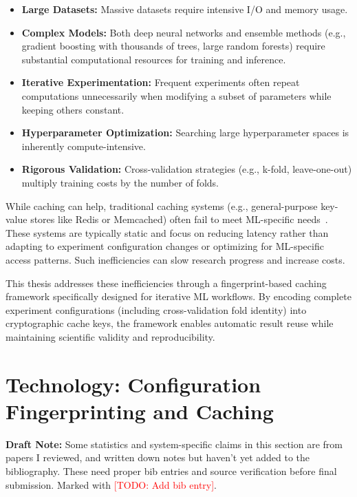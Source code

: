 \documentclass{imc-inf} %
\begin{document}
\begin{itemize}
\item \textbf{Large Datasets:} Massive datasets require intensive I/O and 
      memory usage.
      
\item \textbf{Complex Models:} Both deep neural networks and ensemble 
      methods (e.g., gradient boosting with thousands of trees, large 
      random forests) require substantial computational resources for 
      training and inference.
      
\item \textbf{Iterative Experimentation:} Frequent experiments often repeat 
      computations unnecessarily when modifying a subset of parameters while 
      keeping others constant.
      
\item \textbf{Hyperparameter Optimization:} Searching large hyperparameter 
      spaces is inherently compute-intensive.
      
\item \textbf{Rigorous Validation:} Cross-validation strategies (e.g., 
      k-fold, leave-one-out) multiply training costs by the number of folds.
\end{itemize}

While caching can help, traditional caching systems (e.g., general-purpose 
key-value stores like Redis or Memcached) often fail to meet ML-specific 
needs~\cite{krishna2025cache}. These systems are typically static and focus 
on reducing latency rather than adapting to experiment configuration changes 
or optimizing for ML-specific access patterns. Such inefficiencies can slow 
research progress and increase costs.

This thesis addresses these inefficiencies through a fingerprint-based 
caching framework specifically designed for iterative ML workflows. By 
encoding complete experiment configurations (including cross-validation 
fold identity) into cryptographic cache keys, the framework enables 
automatic result reuse while maintaining scientific validity and 
reproducibility.

\section{Technology: Configuration Fingerprinting and Caching}

\begin{center}
\colorbox{yellow!20}{%
\begin{minipage}{0.9\textwidth}
\textbf{Draft Note:} Some statistics and system-specific claims in this section 
are from papers I reviewed, and written down notes but haven't yet added to the bibliography. These 
need proper bib entries and source verification before final submission. 
Marked with \textcolor{red}{[TODO: Add bib entry]}.
\end{minipage}
}
\end{center}
\end{document}
